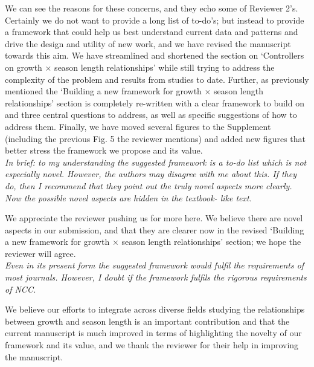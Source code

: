 \documentclass[11pt]{article}
\begin{document}
We can see the reasons for these concerns, and they echo some of Reviewer 2's. Certainly we do not want to provide a long list of to-do's; but instead to provide a framework that could help us best understand current data and patterns and drive the design and utility of new work, and we have revised the manuscript towards this aim. We have streamlined and shortened the section on `Controllers on growth $\times$ season length relationships' while still trying to address the complexity of the problem and results from studies to date. Further, as previously mentioned the  `Building a new framework for growth $\times$ season length relationships' section is completely re-written with a clear framework to build on and three central questions to address, as well as specific suggestions of how to address them. Finally, we have moved several figures to the Supplement (including the previous Fig. 5 the reviewer mentions) and added new figures that better stress the framework we propose and its value. \\

\emph{In brief: to my understanding the suggested framework is a to-do list which is not especially novel. However, the authors may disagree with me about this. If they do, then I recommend that they point out the truly novel aspects more clearly. Now the possible novel aspects are hidden in the textbook- like text.}

We appreciate the reviewer pushing us for more here. We believe there are novel aspects in our submission, and that they are clearer now in the revised `Building a new framework for growth $\times$ season length relationships' section; we hope the reviewer will agree. \\

\emph{Even in its present form the suggested framework would fulfil the requirements of most journals. However, I doubt if the framework fulfils the rigorous requirements of NCC.}

We believe our efforts to integrate across diverse fields studying the relationships between growth and season length is an important contribution and that the current manuscript is much improved in terms of highlighting the novelty of our framework and its value, and we thank the reviewer for their help in improving the manuscript.\\
\end{document}
